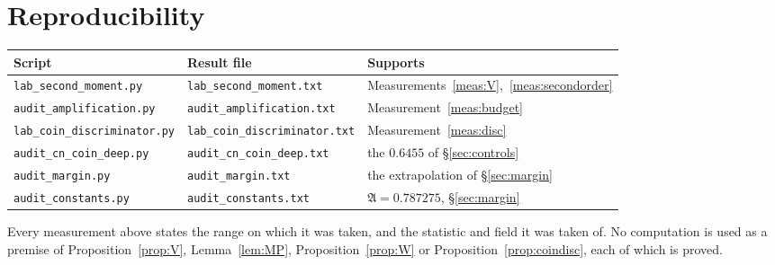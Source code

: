 \documentclass[11pt,a4paper]{article}
\theoremstyle{plain}
\theoremstyle{definition}
\theoremstyle{remark}
\newcommand{\AAA}{\mathfrak{A}}
\begin{document}
\appendix
\section{Reproducibility}

\begin{center}
\begin{tabular}{lll}
\hline
Script & Result file & Supports\\
\hline
\texttt{lab\_second\_moment.py} & \texttt{lab\_second\_moment.txt}
 & Measurements~\ref{meas:V},~\ref{meas:secondorder}\\
\texttt{audit\_amplification.py} & \texttt{audit\_amplification.txt}
 & Measurement~\ref{meas:budget}\\
\texttt{lab\_coin\_discriminator.py} &
 \texttt{lab\_coin\_discriminator.txt} & Measurement~\ref{meas:disc}\\
\texttt{audit\_cn\_coin\_deep.py} & \texttt{audit\_cn\_coin\_deep.txt}
 & the $0.6455$ of \S\ref{sec:controls}\\
\texttt{audit\_margin.py} & \texttt{audit\_margin.txt}
 & the extrapolation of \S\ref{sec:margin}\\
\texttt{audit\_constants.py} & \texttt{audit\_constants.txt}
 & $\AAA=0.787275$, \S\ref{sec:margin}\\
\hline
\end{tabular}
\end{center}

Every measurement above states the range on which it was taken, and
the statistic and field it was taken of. No computation is used as a
premise of Proposition~\ref{prop:V}, Lemma~\ref{lem:MP},
Proposition~\ref{prop:W} or Proposition~\ref{prop:coindisc}, each of
which is proved.
\end{document}
